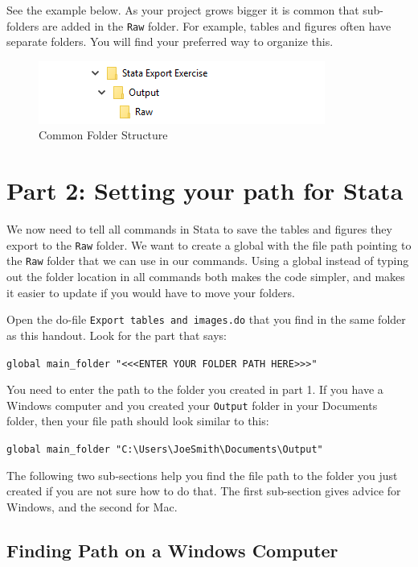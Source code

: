 \documentclass[]{article}
\begin{document}
See the example below. As your project grows bigger it is common that sub-folders are added in the \texttt{Raw} folder. For example, tables and figures often have separate folders. You will find your preferred way to organize this.

\begin{figure}[H]
	\centering
	\includegraphics[width=0.6\linewidth]{img/outputRawFolders}
	\caption{Common Folder Structure}
	\label{fig:pathwin3}
\end{figure} 


\section*{Part 2: Setting your path for Stata}
We now need to tell all commands in Stata to save the tables and figures they export to the \texttt{Raw} folder. We want to create a global with the file path pointing to the \texttt{Raw} folder that we can use in our commands. Using a global instead of typing out the folder location in all commands both makes the code simpler, and makes it easier to update if you would have to move your folders.

Open the do-file \texttt{Export tables and images.do} that you find in the same folder as this handout. Look for the part that says:
\begin{center}
	\verb|global main_folder "<<<ENTER YOUR FOLDER PATH HERE>>>"|
\end{center}

You need to enter the path to the folder you created in part 1. If you have a Windows computer and you created your \texttt{Output} folder in your Documents folder, then your file path should look similar to this:
\begin{center}
	\verb|global main_folder "C:\Users\JoeSmith\Documents\Output"|
\end{center}

The following two sub-sections help you find the file path to the folder you just created if you are not sure how to do that. The first sub-section gives advice for Windows, and the second for Mac.

\subsection*{Finding Path on a Windows Computer}
\end{document}
